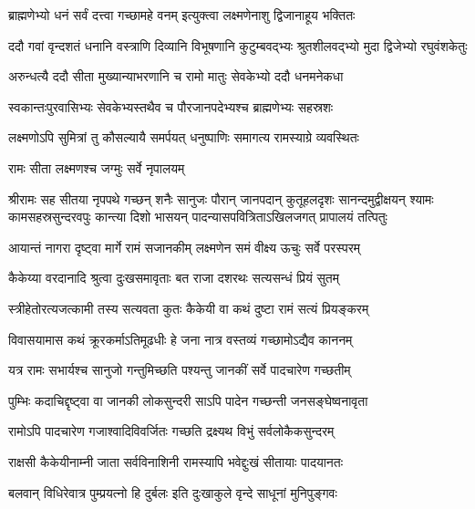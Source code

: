 \twolineshloka
{ब्राह्मणेभ्यो धनं सर्वं दत्त्वा गच्छामहे वनम्}
{इत्युक्त्वा लक्ष्मणेनाशु द्विजानाहूय भक्तितः} %

\fourlineindentedshloka
{ददौ गवां वृन्दशतं धनानि}
{वस्त्राणि दिव्यानि विभूषणानि}
{कुटुम्बवद्भ्यः श्रुतशीलवद्भ्यो}
{मुदा द्विजेभ्यो रघुवंशकेतुः} %

\twolineshloka
{अरुन्धत्यै ददौ सीता मुख्यान्याभरणानि च}
{रामो मातुः सेवकेभ्यो ददौ धनमनेकधा} %

\twolineshloka
{स्वकान्तःपुरवासिभ्यः सेवकेभ्यस्तथैव च}
{पौरजानपदेभ्यश्च ब्राह्मणेभ्यः सहस्रशः} %

\twolineshloka
{लक्ष्मणोऽपि सुमित्रां तु कौसल्यायै समर्पयत्}
{धनुष्पाणिः समागत्य रामस्याग्रे व्यवस्थितः} %

\onelineshloka
{रामः सीता लक्ष्मणश्च जग्मुः सर्वे नृपालयम्} %

{श्रीरामः सह सीतया नृपपथे गच्छन् शनैः सानुजः}
{पौरान् जानपदान् कुतूहलदृशः सानन्दमुद्वीक्षयन्}
{श्यामः कामसहस्रसुन्दरवपुः कान्त्या दिशो भासयन्}
{पादन्यासपवित्रिताऽखिलजगत् प्रापालयं तत्पितुः} %





\twolineshloka
{आयान्तं नागरा दृष्ट्वा मार्गे रामं सजानकीम्}
{लक्ष्मणेन समं वीक्ष्य ऊचुः सर्वे परस्परम्} %

\twolineshloka
{कैकेय्या वरदानादि श्रुत्वा दुःखसमावृताः}
{बत राजा दशरथः सत्यसन्धं प्रियं सुतम्} %

\twolineshloka
{स्त्रीहेतोरत्यजत्कामी तस्य सत्यवता कुतः}
{कैकेयी वा कथं दुष्टा रामं सत्यं प्रियङ्करम्} %

\twolineshloka
{विवासयामास कथं क्रूरकर्माऽतिमूढधीः}
{हे जना नात्र वस्तव्यं गच्छामोऽद्यैव काननम्} %

\twolineshloka
{यत्र रामः सभार्यश्च सानुजो गन्तुमिच्छति}
{पश्यन्तु जानकीं सर्वे पादचारेण गच्छतीम्} %

\twolineshloka
{पुम्भिः कदाचिद्दृष्ट्वा वा जानकी लोकसुन्दरी}
{साऽपि पादेन गच्छन्ती जनसङ्घेष्वनावृता} %

\twolineshloka
{रामोऽपि पादचारेण गजाश्वादिविवर्जितः}
{गच्छति द्रक्ष्यथ विभुं सर्वलोकैकसुन्दरम्} %

\twolineshloka
{राक्षसी कैकेयीनाम्नी जाता सर्वविनाशिनी}
{रामस्यापि भवेद्दुःखं सीतायाः पादयानतः} %

\twolineshloka
{बलवान् विधिरेवात्र पुम्प्रयत्नो हि दुर्बलः}
{इति दुःखाकुले वृन्दे साधूनां मुनिपुङ्गवः} %


